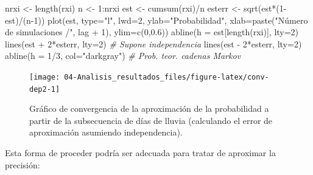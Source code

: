 \documentclass[
]{book}
\newenvironment{Shaded}{\begin{snugshade}}{\end{snugshade}}
\newcommand{\AttributeTok}[1]{\textcolor[rgb]{0.77,0.63,0.00}{#1}}
\newcommand{\CommentTok}[1]{\textcolor[rgb]{0.56,0.35,0.01}{\textit{#1}}}
\newcommand{\DecValTok}[1]{\textcolor[rgb]{0.00,0.00,0.81}{#1}}
\newcommand{\FloatTok}[1]{\textcolor[rgb]{0.00,0.00,0.81}{#1}}
\newcommand{\FunctionTok}[1]{\textcolor[rgb]{0.00,0.00,0.00}{#1}}
\newcommand{\NormalTok}[1]{#1}
\newcommand{\OtherTok}[1]{\textcolor[rgb]{0.56,0.35,0.01}{#1}}
\newcommand{\SpecialCharTok}[1]{\textcolor[rgb]{0.00,0.00,0.00}{#1}}
\newcommand{\StringTok}[1]{\textcolor[rgb]{0.31,0.60,0.02}{#1}}
\theoremstyle{break}
\theoremstyle{definition}
\theoremstyle{definition}
\theoremstyle{definition}
\theoremstyle{definition}
\theoremstyle{remark}
\begin{document}
\begin{Shaded}
\begin{Highlighting}[]
\NormalTok{nrxi }\OtherTok{\textless{}{-}} \FunctionTok{length}\NormalTok{(rxi)}
\NormalTok{n }\OtherTok{\textless{}{-}} \DecValTok{1}\SpecialCharTok{:}\NormalTok{nrxi}
\NormalTok{est }\OtherTok{\textless{}{-}} \FunctionTok{cumsum}\NormalTok{(rxi)}\SpecialCharTok{/}\NormalTok{n}
\NormalTok{esterr }\OtherTok{\textless{}{-}} \FunctionTok{sqrt}\NormalTok{(est}\SpecialCharTok{*}\NormalTok{(}\DecValTok{1}\SpecialCharTok{{-}}\NormalTok{est)}\SpecialCharTok{/}\NormalTok{(n}\DecValTok{{-}1}\NormalTok{))}
\FunctionTok{plot}\NormalTok{(est, }\AttributeTok{type=}\StringTok{"l"}\NormalTok{, }\AttributeTok{lwd=}\DecValTok{2}\NormalTok{, }\AttributeTok{ylab=}\StringTok{"Probabilidad"}\NormalTok{, }
     \AttributeTok{xlab=}\FunctionTok{paste}\NormalTok{(}\StringTok{"Número de simulaciones /"}\NormalTok{, lag }\SpecialCharTok{+} \DecValTok{1}\NormalTok{), }\AttributeTok{ylim=}\FunctionTok{c}\NormalTok{(}\DecValTok{0}\NormalTok{,}\FloatTok{0.6}\NormalTok{))}
\FunctionTok{abline}\NormalTok{(}\AttributeTok{h =}\NormalTok{ est[}\FunctionTok{length}\NormalTok{(rxi)], }\AttributeTok{lty=}\DecValTok{2}\NormalTok{)}
\FunctionTok{lines}\NormalTok{(est }\SpecialCharTok{+} \DecValTok{2}\SpecialCharTok{*}\NormalTok{esterr, }\AttributeTok{lty=}\DecValTok{2}\NormalTok{) }\CommentTok{\# Supone independencia}
\FunctionTok{lines}\NormalTok{(est }\SpecialCharTok{{-}} \DecValTok{2}\SpecialCharTok{*}\NormalTok{esterr, }\AttributeTok{lty=}\DecValTok{2}\NormalTok{)}
\FunctionTok{abline}\NormalTok{(}\AttributeTok{h =} \DecValTok{1}\SpecialCharTok{/}\DecValTok{3}\NormalTok{, }\AttributeTok{col=}\StringTok{"darkgray"}\NormalTok{)     }\CommentTok{\# Prob. teor. cadenas Markov}
\end{Highlighting}
\end{Shaded}

\begin{figure}[!htb]

{\centering \texttt{[image: 04-Analisis\_resultados\_files/figure-latex/conv-dep2-1]} 

}

\caption{Gráfico de convergencia de la aproximación de la probabilidad a partir de la subsecuencia de días de lluvia (calculando el error de aproximación asumiendo independencia).}\label{fig:conv-dep2}
\end{figure}

Esta forma de proceder podría ser adecuada para tratar de aproximar la precisión:
\end{document}
